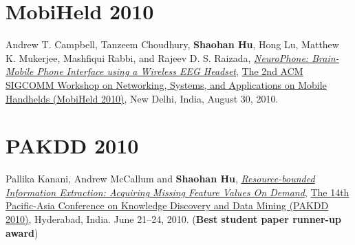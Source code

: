 \section{\sc MobiHeld 2010}\hypertarget{campbell2010mobiheld}{}
Andrew T. Campbell, Tanzeem Choudhury, \textbf{Shaohan Hu}, Hong Lu, Matthew K. Mukerjee, Mashfiqui Rabbi, and Rajeev D. S. Raizada,
\href{http://portal.acm.org/citation.cfm?id=1851326}{\emph{NeuroPhone: Brain-Mobile Phone Interface using a Wireless EEG Headset}},
\href{http://conferences.sigcomm.org/sigcomm/2010/mhcfp.php}{\textsf{The 2nd ACM SIGCOMM Workshop on Networking, Systems, and Applications on Mobile Handhelds (MobiHeld 2010)}},
New Delhi, India, August 30, 2010.

\section{\sc PAKDD 2010}\hypertarget{kanani2010pakdd}{}
Pallika Kanani, Andrew McCallum and \textbf{Shaohan Hu},
\href{http://www.springerlink.com/content/j41w758434321108}{\emph{Resource-bounded Information Extraction: Acquiring Missing Feature Values On Demand}},
\href{http://www.iiit.ac.in/conferences/pakdd2010}{\textsf{The 14th Pacific-Asia Conference on Knowledge Discovery and Data Mining (PAKDD 2010)}},
Hyderabad, India. June 21--24, 2010. (\textbf{Best student paper runner-up award})

